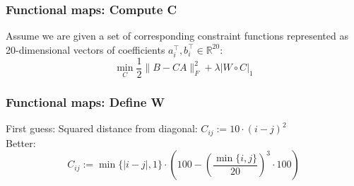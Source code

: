 \documentclass[compress]{beamer}
\begin{document}
\begin{frame}[fragile]
\frametitle{Functional maps: Compute C}
Assume we are given a set of corresponding constraint functions represented as 20-dimensional vectors of coefficients $a_i^\top,b_i^\top \in \mathbb{R}^{20}$:
$$
	\min_C \frac{1}{2} \| B - CA \|_F^2 + \lambda |W \circ C|_1
$$
\end{frame}
\begin{frame}[fragile]
\frametitle{Functional maps: Define W}
First guess: Squared distance from diagonal: $C_{ij}:=10 \cdot (i-j)^2$\\
Better:
$$
	C_{ij} :=\min\{|i - j|, 1\} \cdot (100 - \left(\frac{\min\{i, j\}}{20}\right)^3 \cdot 100)
$$
\begin{figure}[htp]
  \begin{center}

\end{center}
\end{figure}
\end{frame}
\end{document}
